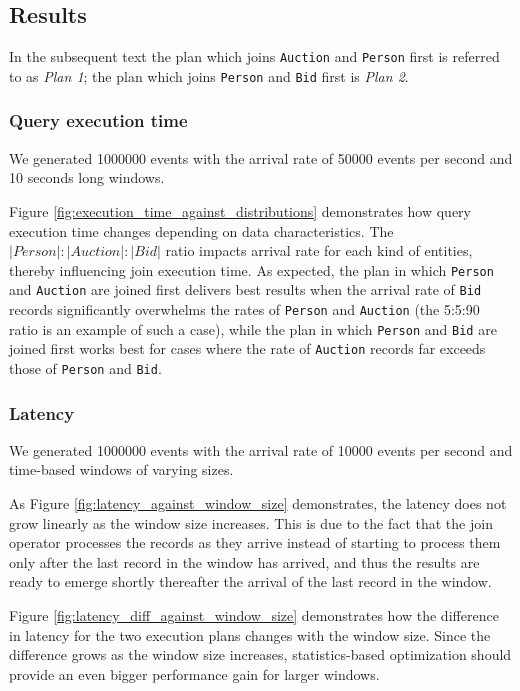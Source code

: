 \subsection{Results}

In the subsequent text the plan which joins \texttt{Auction} and \texttt{Person} first is referred to as \textit{Plan 1}; the plan which joins \texttt{Person} and \texttt{Bid} first is \textit{Plan 2}.


\subsubsection{Query execution time}
We generated 1000000 events with the arrival rate of 50000 events per second and 10 seconds long windows.

Figure \ref{fig:execution_time_against_distributions} demonstrates how query execution time changes depending on data characteristics. The $|Person|:|Auction|:|Bid|$ ratio impacts arrival rate for each kind of entities, thereby influencing join execution time. As expected, the plan in which \texttt{Person} and \texttt{Auction} are joined first delivers best results when the arrival rate of \texttt{Bid} records significantly overwhelms the rates of \texttt{Person} and \texttt{Auction} (the 5:5:90 ratio is an example of such a case), while the plan in which \texttt{Person} and \texttt{Bid} are joined first works best for cases where the rate of \texttt{Auction} records far exceeds those of \texttt{Person} and \texttt{Bid}. 


\subsubsection{Latency}

We generated 1000000 events with the arrival rate of 10000 events per second and time-based windows of varying sizes.


As Figure \ref{fig:latency_against_window_size} demonstrates, the latency does not grow linearly as the window size increases. This is due to the fact that the join operator processes the records as they arrive instead of starting to process them only after the last record in the window has arrived, and thus the results are ready to emerge shortly thereafter the arrival of the last record in the window.

Figure \ref{fig:latency_diff_against_window_size} demonstrates how the difference in latency for the two execution plans changes with the window size. Since the difference grows as the window size increases, statistics-based optimization should provide an even bigger performance gain for larger windows.


